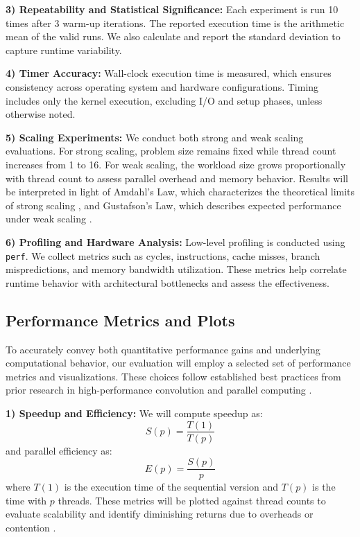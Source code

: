 \documentclass[conference, 10pt]{IEEEtran}
\begin{document}
\begin{itemize}
\begin{itemize}
\vspace{0.5em}
\textbf{3) Repeatability and Statistical Significance:} Each experiment is run 10 times after 3 warm-up iterations. The reported execution time is the arithmetic mean of the valid runs. We also calculate and report the standard deviation to capture runtime variability.

\vspace{0.5em}
\textbf{4) Timer Accuracy:} Wall-clock execution time is measured, which ensures consistency across operating system and hardware configurations. Timing includes only the kernel execution, excluding I/O and setup phases, unless otherwise noted.

\vspace{0.5em}
\textbf{5) Scaling Experiments:} 
We conduct both strong and weak scaling evaluations. For strong scaling, problem size remains fixed while thread count increases from 1 to 16. For weak scaling, the workload size grows proportionally with thread count to assess parallel overhead and memory behavior. Results will be interpreted in light of Amdahl’s Law, which characterizes the theoretical limits of strong scaling \cite{hager2021hpc}, and Gustafson’s Law, which describes expected performance under weak scaling \cite{Gustafson1988}.


\vspace{0.5em}
\textbf{6) Profiling and Hardware Analysis:} Low-level profiling is conducted using \texttt{perf}. We collect metrics such as cycles, instructions, cache misses, branch mispredictions, and memory bandwidth utilization. These metrics help correlate runtime behavior with architectural bottlenecks and assess the effectiveness.


\subsection{\textbf{Performance Metrics and Plots}}

To accurately convey both quantitative performance gains and underlying computational behavior, our evaluation will employ a selected set of performance metrics and visualizations. These choices follow established best practices from prior research in high-performance convolution and parallel computing \cite{Wang2023,  hager2021hpc, Rajput2013, Yoon2012}.

\vspace{0.5em}
\textbf{1) Speedup and Efficiency:} 
We will compute speedup as:
\begin{equation}
    S(p) = \frac{T(1)}{T(p)}
\end{equation}
and parallel efficiency as:
\begin{equation}
    E(p) = \frac{S(p)}{p}
\end{equation}
where \(T(1)\) is the execution time of the sequential version and \(T(p)\) is the time with \(p\) threads. These metrics will be plotted against thread counts to evaluate scalability and identify diminishing returns due to overheads or contention \cite{Rajput2013}.


\end{itemize}
\end{itemize}
\end{document}
